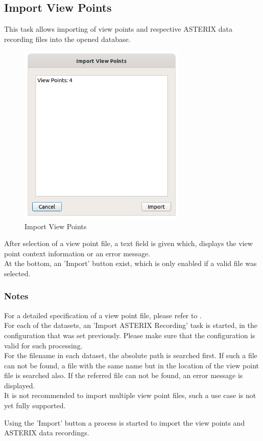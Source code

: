 \subsection{Import View Points}
\label{sec:ui_import_viewpoints}

This task allows importing of view points and respective ASTERIX data recording files into the opened database. \\


\begin{figure}[H]
  \center
    \includegraphics[width=8cm]{figures/view_point_import.png}
  \caption{Import View Points}
\end{figure}

After selection of a view point file, a text field is given which, displays the view point context information or an error message. \\

At the bottom, an 'Import' button exist, which is only enabled if a valid file was selected.

\subsubsection{Notes}

For a detailed specification of a view point file, please refer to . \\

For each of the datasets, an 'Import ASTERIX Recording' task is started, in the configuration that was set previously. Please make sure that the configuration is valid for such processing. \\

For the filename in each dataset, the absolute path is searched first. If such a file can not be found, a file with the same name but in the location of the view point file is searched also. If the referred file can not be found, an error message is displayed. \\

It is not recommended to import multiple view point files, such a use case is not yet fully supported.

Using the 'Import' button a process is started to import the view points and ASTERIX data recordings. \\

